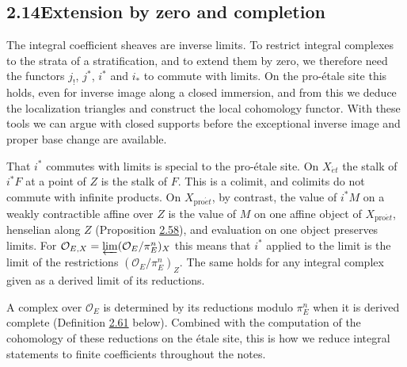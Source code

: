 \documentclass[11pt]{article}
\begin{document}
\subsection*{\texorpdfstring{2.14\quad Extension by zero and completion}{2.14 Extension by zero and completion}}
\label{bp179}%
\label{bp180}%
The integral coefficient sheaves are inverse limits. To restrict integral complexes to the strata of a stratification, and to extend them by zero, we therefore need the functors \(j_!\), \(j^*\), \(i^*\) and \(i_*\) to commute with limits. On the pro-étale site this holds, even for inverse image along a closed immersion, and from this we deduce the localization triangles and construct the local cohomology functor. With these tools we can argue with closed supports before the exceptional inverse image and proper base change are available.

That \(i^*\) commutes with limits is special to the pro-étale site. On \(X_{\acute{e}t}\) the stalk of \(i^*F\) at a point of \(Z\) is the stalk of \(F\). This is a colimit, and colimits do not commute with infinite products. On \(X_{\mathrm{pro}\acute{e}t}\), by contrast, the value of \(i^*M\) on a weakly contractible affine over \(Z\) is the value of \(M\) on one affine object of \(X_{\mathrm{pro}\acute{e}t}\), henselian along \(Z\) (Proposition \hyperref[bp181]{2.58}), and evaluation on one object preserves limits. For \(\mathcal O_{E,X}=\varprojlim(\mathcal O_E/\pi_E^n)_X\) this means that \(i^*\) applied to the limit is the limit of the restrictions \((\mathcal O_E/\pi_E^n)_Z\). The same holds for any integral complex given as a derived limit of its reductions.

A complex over \(\mathcal O_E\) is determined by its reductions modulo \(\pi_E^n\) when it is derived complete (Definition \hyperref[bp188]{2.61} below). Combined with the computation of the cohomology of these reductions on the étale site, this is how we reduce integral statements to finite coefficients throughout the notes.
\end{document}
